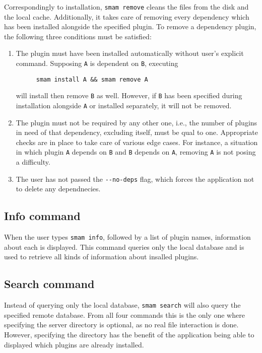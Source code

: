 Correspondingly to installation, \verb|smam remove| cleans the files from the disk and the local cache.
Additionally, it takes care of removing every dependency which has been installed alongside the specified plugin.
To remove a dependency plugin, the following three conditions must be satisfied:
\begin{enumerate}
\item
The plugin must have been installed automatically without user's explicit command.
Supposing \verb|A| is dependent on \verb|B|, executing

\begin{figure}[htp]
\centering
\verb|smam install A && smam remove A|
\end{figure}

will install then remove \verb|B| as well.
However, if \verb|B| has been specified during installation alongside \verb|A| or installed separately, it will not be removed.

\item
The plugin must not be required by any other one, i.e., the number of plugins in need of that dependency, excluding itself, must be qual to one.
Appropriate checks are in place to take care of various edge cases.
For instance, a situation in which plugin \verb|A| depends on \verb|B| and \verb|B| depends on \verb|A|, removing \verb|A| is not posing a difficulty.

\item
The user has not passed the \verb|--no-deps| flag, which forces the application not to delete any dependnecies.

\end{enumerate}

\subsection{Info command}

When the user types \verb|smam info|, followed by a list of plugin names, information about each is displayed.
This command queries only the local database and is used to retrieve all kinds of information about insalled plugins.

\subsection{Search command}

Instead of querying only the local database, \verb|smam search| will also query the specified remote database.
From all four commands this is the only one where specifying the server directory is optional, as no real file interaction is done.
However, specifying the directory has the benefit of the application being able to displayed which plugins are already installed.

